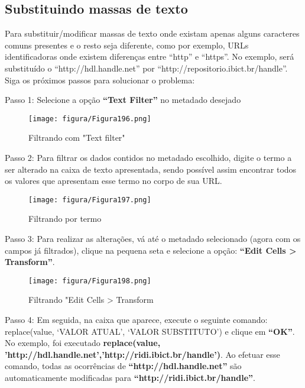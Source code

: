 \documentclass[12pt,hidelinks]{article}
\begin{document}
\newpage

    \subsection{Substituindo massas de texto}
    
    Para substituir/modificar massas de texto onde existam apenas alguns caracteres comuns presentes e o resto seja diferente, como por exemplo, URLs identificadoras onde existem diferenças entre “http” e “https”. No exemplo, será substituído o “http://hdl.handle.net” por “http://repositorio.ibict.br/handle”. Siga os próximos passos para solucionar o problema: 
    
    \singlespacing
    
    Passo 1: Selecione a opção \textbf{“Text Filter”} no metadado desejado
    
    \begin{figure}[!htp]
                \centering
                \texttt{[image: figura/Figura196.png]}
                \caption{Filtrando com "Text filter"}
            \label{Rotulo}
        \end{figure}

    Passo 2: Para filtrar os dados contidos no metadado escolhido, digite o termo a ser alterado na caixa de texto apresentada, sendo possível assim encontrar todos os valores que apresentam esse termo no corpo de sua URL.
    
    \begin{figure}[!htp]
                \centering
                \texttt{[image: figura/Figura197.png]}
                \caption{Filtrando por termo}
            \label{Rotulo}
        \end{figure}
    
\newpage

    Passo 3: Para realizar as alterações, vá até o metadado selecionado (agora com os campos já filtrados), clique na pequena seta e selecione a opção: \textbf{“Edit Cells > Transform”}.
    
    \begin{figure}[!htp]
                \centering
                \texttt{[image: figura/Figura198.png]}
                \caption{Filtrando "Edit Cells > Transform}
            \label{Rotulo}
        \end{figure}
    
    Passo 4: Em seguida, na caixa que aparece, execute o seguinte comando: replace(value, ‘VALOR ATUAL’, ‘VALOR SUBSTITUTO’) e clique em \textbf{“OK”}. No exemplo, foi executado \textbf{replace(value, 'http://hdl.handle.net','http://ridi.ibict.br/handle')}. Ao efetuar esse comando, todas as ocorrências de \textbf{“http://hdl.handle.net”} são automaticamente modificadas para \textbf{“http://ridi.ibict.br/handle”}.
    
\end{document}
